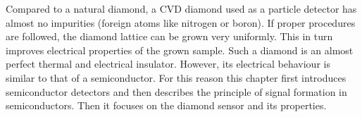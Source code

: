 Compared to a natural diamond, a CVD diamond used as a particle detector has almost no impurities (foreign atoms like nitrogen or boron). If proper procedures are followed, the diamond lattice can be grown very uniformly. This in turn improves electrical properties of the grown sample. Such a diamond is an almost perfect thermal and electrical insulator. However, its electrical behaviour is similar to that of a semiconductor. For this reason this chapter first introduces semiconductor detectors and then describes the principle of signal formation in semiconductors. Then it focuses on the diamond sensor and its properties.


